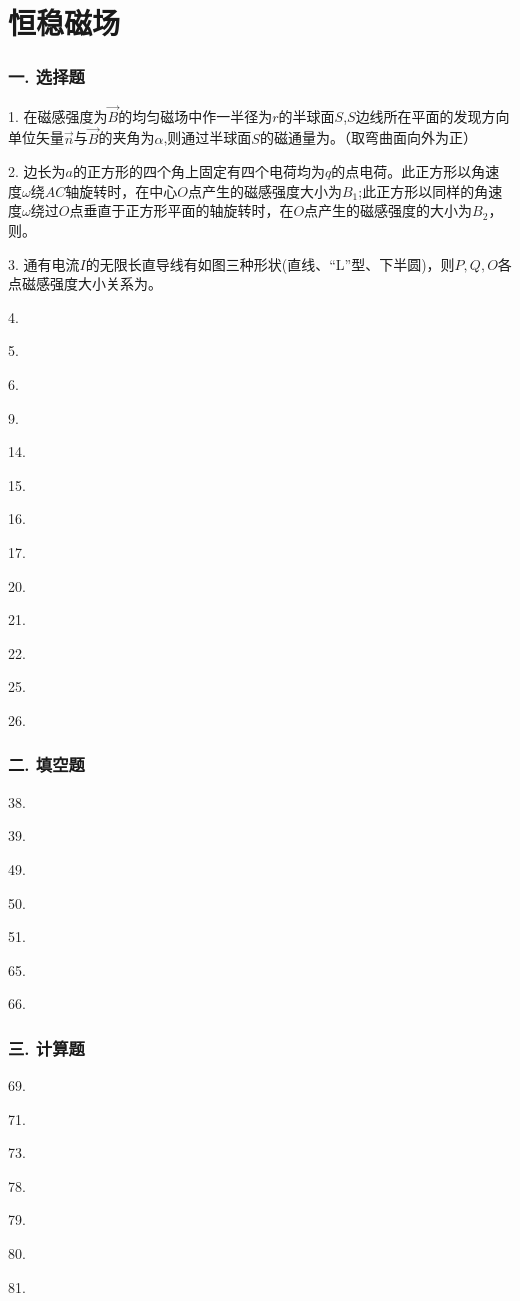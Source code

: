 \section*{恒稳磁场}

\subsubsection*{一. 选择题}

1. 在磁感强度为$\vec B$的均匀磁场中作一半径为$r$的半球面$S$,$S$边线所在平面的发现方向单位矢量$\vec n$与$\vec B$的夹角为$\alpha$,则通过半球面$S$的磁通量为。（取弯曲面向外为正）

2. 边长为$a$的正方形的四个角上固定有四个电荷均为$q$的点电荷。此正方形以角速度$\omega$绕$AC$轴旋转时，在中心$O$点产生的磁感强度大小为$B_1$;此正方形以同样的角速度$\omega$绕过$O$点垂直于正方形平面的轴旋转时，在$O$点产生的磁感强度的大小为$B_2$，则。

3. 通有电流$I$的无限长直导线有如图三种形状(直线、“L”型、下半圆)，则$P,Q,O$各点磁感强度大小关系为。

4. 

5. 

6. 

9. 

14. 

15. 

16. 

17. 

20. 

21. 

22. 

25. 

26. 


\subsubsection*{二. 填空题}

38. 

39. 

49. 

50. 

51. 

65. 

66. 

\subsubsection*{三. 计算题}

69. 

71. 

73. 

78. 

79. 

80. 

81. 
